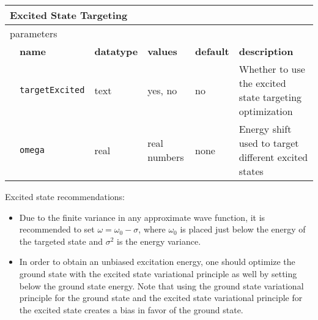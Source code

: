 \begin{table}[h]
\begin{center}
\begin{tabularx}{\textwidth}{l l l l l l }
\hline
\multicolumn{6}{l}{Excited State Targeting} \\
\hline
\multicolumn{2}{l}{parameters}  & \multicolumn{4}{l}{}\\
   &   \bfseries name     & \bfseries datatype & \bfseries values & \bfseries default   & \bfseries description \\
   &   \texttt{targetExcited} &  text   & yes, no      & no   & Whether to use the excited state targeting optimization\\
   &   \texttt{omega}         &  real   & real numbers & none & Energy shift used to target different excited states\\
  \hline
\end{tabularx}
\end{center}
\end{table}

Excited state recommendations:
\begin{itemize}
  \item Due to the finite variance in any approximate wave function, it is recommended to set $\omega=\omega_0-\sigma$, where $\omega_0$ is placed just
        below the energy of the targeted state and $\sigma^2$ is the energy variance.
  \item In order to obtain an unbiased excitation energy, one should optimize the ground state with the excited state variational principle as well by setting
         below the ground state energy.  Note that using the ground state variational principle for the ground state and the excited state variational
        principle for the excited state creates a bias in favor of the ground state. 
\end{itemize}

